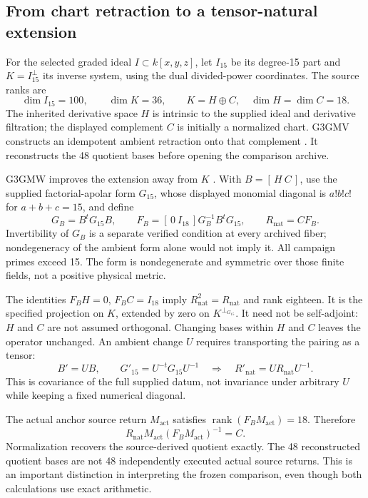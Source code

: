 \documentclass[11pt,a4paper]{article}
\begin{document}
\subsection{From chart retraction to a tensor-natural extension}
\label{sec:apolar-natural-retraction}

For the selected graded ideal \(I\subset k[x,y,z]\), let \(I_{15}\) be
its degree-15 part and \(K=I_{15}^{\perp}\) its inverse system, using the
dual divided-power coordinates. The source ranks are
\[
 \dim I_{15}=100,\qquad \dim K=36,\qquad
 K=H\oplus C,\quad \dim H=\dim C=18.
\]
The inherited derivative space \(H\) is intrinsic to the supplied ideal
and derivative filtration; the displayed complement \(C\) is initially a
normalized chart. G3GMV constructs an idempotent ambient retraction onto
that complement \cite{UnifiedSelectedRetraction2026}. It reconstructs
the 48 quotient bases before opening the comparison archive.

G3GMW improves the extension away from \(K\)
\cite{UnifiedNaturalRetraction2026}. With \(B=[\,H\ C\,]\), use the supplied
factorial-apolar form \(G_{15}\), whose displayed monomial diagonal is
\(a!b!c!\) for \(a+b+c=15\), and define
\[
 G_B=B^tG_{15}B,\qquad
 F_B=[\,0\ I_{18}\,]G_B^{-1}B^tG_{15},\qquad
 R_{\mathrm{nat}}=CF_B.
 \tag{P6}\label{eq:apolar-natural-map}
\]
Invertibility of \(G_B\) is a separate verified condition at every archived
fiber; nondegeneracy of the ambient form alone would not imply it.
All campaign primes exceed 15. The form is nondegenerate and symmetric
over those finite fields, not a positive physical metric.

The identities \(F_BH=0\), \(F_BC=I_{18}\) imply
\(R_{\mathrm{nat}}^2=R_{\mathrm{nat}}\) and rank eighteen.
It is the specified projection on \(K\), extended by zero on
\(K^{\perp_{G_{15}}}\). It need not be self-adjoint: \(H\) and \(C\)
are not assumed orthogonal. Changing bases within \(H\) and \(C\) leaves
the operator unchanged. An ambient change \(U\) requires transporting
the pairing as a tensor:
\[
 B'=UB,\qquad G'_{15}=U^{-t}G_{15}U^{-1}
 \quad\Longrightarrow\quad
 R'_{\mathrm{nat}}=UR_{\mathrm{nat}}U^{-1}.
 \tag{P7}\label{eq:apolar-tensor-law}
\]
This is covariance of the full supplied datum, not invariance under
arbitrary \(U\) while keeping a fixed numerical diagonal.

The actual anchor source return \(M_{\mathrm{act}}\) satisfies
\(\operatorname{rank}(F_BM_{\mathrm{act}})=18\). Therefore
\[
 R_{\mathrm{nat}}M_{\mathrm{act}}
 (F_BM_{\mathrm{act}})^{-1}=C.
\]
Normalization recovers the source-derived quotient exactly. The 48
reconstructed quotient bases are not 48 independently executed actual
source returns. This is an important distinction in interpreting the
frozen comparison, even though both calculations use exact arithmetic.
\end{document}
